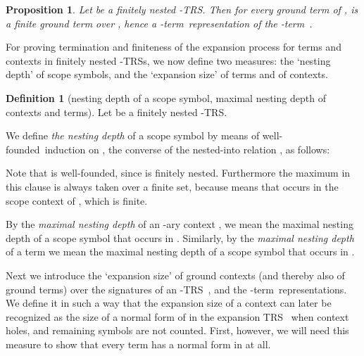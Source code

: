 \documentclass[
submission
]{dmtcs-episciences-tampered}
\newcommand{\nb}{\nobreakdash}
\newcommand{\TRS}{TRS}
\newcommand{\nary}[1]{{}\nb-ary}
\newcommand{\lambdaterm}{\nb-term}
\newcommand{\lTRS}{\hspace*{-0.5pt}\nb-\hspace*{-0.5pt}\TRS}
\newcommand{\lTRSs}{\lTRS{s}}
\newcommand{\wellfounded}{well-found\-ed}
\theoremstyle{plain}
\newtheorem{proposition}[theorem]{Proposition}
\theoremstyle{definition}
\newtheorem{definition}[theorem]{Definition}
\begin{document}
\begin{proposition}\label{prop:lTRS-term:fin:nested:defines:lterrep}
  Let  be a finitely nested \lTRS. 
  Then for every ground term  of , 
   is a finite ground term over , hence a \lambdaterm\ representation
  of the \lambdaterm\ .
\end{proposition}
 

For proving termination and finiteness of the expansion process for terms and contexts in finitely nested \lTRSs,
we now define two measures: the `nesting depth' of scope symbols, and the `expansion size' of terms and of contexts.

\begin{definition}[nesting depth of a scope symbol, maximal nesting depth of contexts and terms]
  Let  be a finitely nested \lTRS.   
  
  We define \emph{the nesting depth } of a scope symbol 
  by means of \wellfounded\ induction on , the converse of the nested-into relation , as follows:
  
  Note that  is well-founded, since  is finitely nested. 
  Furthermore the maximum in this clause is always taken over a finite set,
  because  
  means that  occurs in the scope context  of , which is finite. 
 
  By the \emph{maximal nesting depth } of an \nary{n} context ,  
  we mean the maximal nesting depth of a scope symbol that occurs in .
  Similarly, by the \emph{maximal nesting depth } of a term   
  we mean the maximal nesting depth of a scope symbol that occurs in .
\end{definition}





Next we introduce the `expansion size' of ground contexts (and thereby also of ground terms) over the signatures of an \lTRS~, and the \lambdaterm\ representations.
We define it in such a way that the expansion size of a context  can later be recognized as the size of a normal form of 
in the expansion TRS~ when context holes, and remaining symbols  are not counted.
First, however,
we will need this measure to show that every term  has a normal form in  at all.
\end{document}
